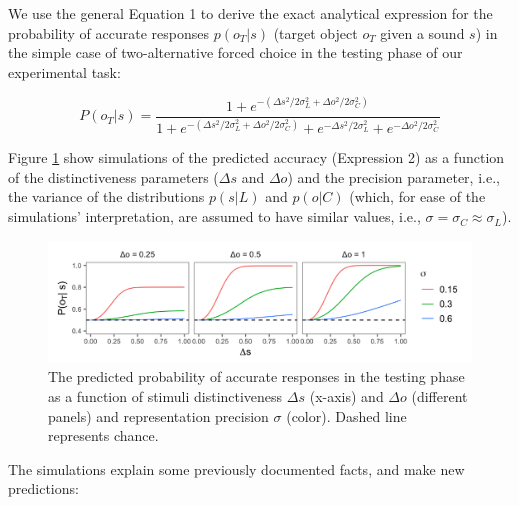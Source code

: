 \documentclass[10pt, letterpaper]{article}
\newenvironment{CodeChunk}{}{}
\begin{document}
We use the general Equation 1 to derive the exact analytical expression
for the probability of accurate responses \(p(o_T | s)\) (target object
\(o_T\) given a sound \(s\)) in the simple case of two-alternative
forced choice in the testing phase of our experimental task:

\begin{equation}
P(o_T|s)= \frac{1 + e^{-(\Delta s^2/2\sigma_L^2+ \Delta o^2/2\sigma_C^2)}}{1 + e^{-(\Delta s^2/2\sigma_L^2+ \Delta o^2/2\sigma_C^2)}+ e^{-\Delta s^2 /2\sigma_L^2} + e^{-\Delta o^2 /2\sigma_C^2 }}
\end{equation}

Figure \ref{fig:simulation} show simulations of the predicted accuracy
(Expression 2) as a function of the distinctiveness parameters
(\(\Delta s\) and \(\Delta o\)) and the precision parameter, i.e., the
variance of the distributions \(p(s| L)\) and \(p(o | C)\) (which, for
ease of the simulations' interpretation, are assumed to have similar
values, i.e., \(\sigma =\sigma_C \approx \sigma_L\)).

\begin{CodeChunk}
\begin{figure}[h]

{\centering \includegraphics{figs/simulation-1} 

}

\caption{\label{fig:simulation}The predicted probability of accurate responses in the testing phase as a function of stimuli distinctiveness $\Delta s$ (x-axis) and $\Delta o$ (different panels) and representation precision $\sigma$ (color). Dashed line represents chance.}\label{fig:simulation}
\end{figure}
\end{CodeChunk}

The simulations explain some previously documented facts, and make new
predictions:
\end{document}
